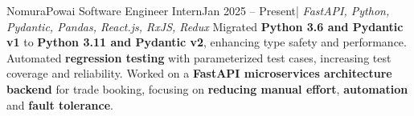 \resumeSubheading
{Nomura}{Powai}
{Software Engineer Intern}{Jan 2025 -- Present}{| \textit{FastAPI, Python, Pydantic, Pandas, React.js, RxJS, Redux}}
\resumeItemListStart
{}
{Migrated \textbf{Python 3.6 and Pydantic v1} to \textbf{Python 3.11 and Pydantic v2}, enhancing type safety and performance.}
{Automated \textbf{regression testing} with parameterized test cases, increasing test coverage and reliability.}
{Worked on a \textbf{FastAPI microservices architecture backend} for trade booking, focusing on \textbf{reducing manual effort}, \textbf{automation} and \textbf{fault tolerance}.}
\resumeItemListEnd